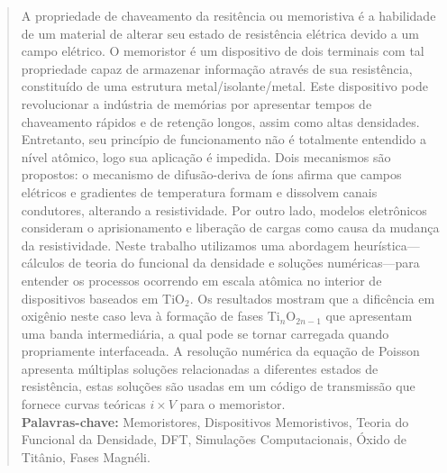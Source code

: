 
\begin{quote}
A propriedade de chaveamento da resitência ou memoristiva é a habilidade de um material de alterar seu estado de resistência elétrica devido a um campo elétrico. O memoristor é um dispositivo de dois terminais com tal propriedade capaz de armazenar informação através de sua resistência, constituído de uma estrutura metal/isolante/metal. Este dispositivo pode revolucionar a indústria de memórias por apresentar tempos de chaveamento rápidos e de retenção longos, assim como altas densidades. Entretanto, seu princípio de funcionamento não é totalmente entendido a nível atômico, logo sua aplicação é impedida. Dois mecanismos são propostos: o mecanismo de difusão-deriva de íons afirma que campos elétricos e gradientes de temperatura formam e dissolvem canais condutores, alterando a resistividade. Por outro lado, modelos eletrônicos consideram o aprisionamento e liberação de cargas como causa da mudança da resistividade. Neste trabalho utilizamos uma abordagem heurística---cálculos de teoria do funcional da densidade e soluções numéricas---para entender os processos ocorrendo em escala atômica no interior de dispositivos baseados em TiO$_2$. Os resultados mostram que a dificência em oxigênio neste caso leva à formação de fases Ti$_n$O$_{2n-1}$ que apresentam uma banda intermediária, a qual pode se tornar carregada quando propriamente interfaceada. A resolução numérica da equação de Poisson apresenta múltiplas soluções relacionadas a diferentes estados de resistência, estas soluções são usadas em um código de transmissão que fornece curvas teóricas $i \times V$ para o memoristor. \\ \textbf{Palavras-chave:} Memoristores, Dispositivos Memoristivos, Teoria do Funcional da Densidade, DFT, Simulações Computacionais, Óxido de Titânio, Fases Magnéli.
\end{quote}

\newpage